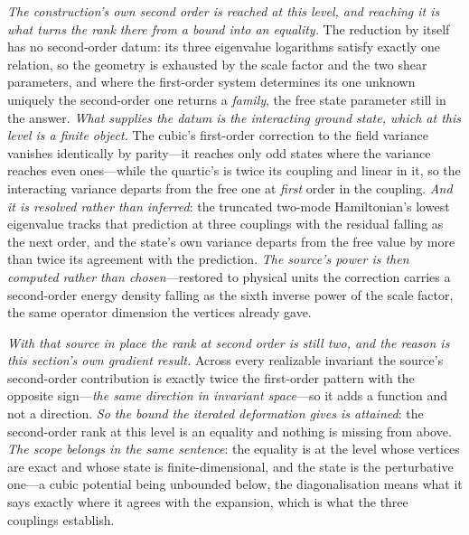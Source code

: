 \documentclass[11pt,a4paper]{article}
\theoremstyle{plain}
\theoremstyle{definition}
\theoremstyle{remark}
\begin{document}
\emph{The construction's own second order is reached at this level, and reaching it is what turns the rank
there from a bound into an equality.} The reduction by itself has no second-order datum: its three eigenvalue
logarithms satisfy exactly one relation, so the geometry is exhausted by the scale factor and the two shear
parameters, and where the first-order system determines its one unknown uniquely the second-order one returns a
\emph{family}, the free state parameter still in the answer. \emph{What supplies the datum is the interacting
ground state, which at this level is a finite object.} The cubic's first-order correction to the field variance
vanishes identically by parity---it reaches only odd states where the variance reaches even ones---while the
quartic's is twice its coupling and linear in it, so the interacting variance departs from the free one at
\emph{first} order in the coupling. \emph{And it is resolved rather than inferred}: the truncated two-mode
Hamiltonian's lowest eigenvalue tracks that prediction at three couplings with the residual falling as the next
order, and the state's own variance departs from the free value by more than twice its agreement with the
prediction. \emph{The source's power is then computed rather than chosen}---restored to physical units the
correction carries a second-order energy density falling as the sixth inverse power of the scale factor, the
same operator dimension the vertices already gave.

\emph{With that source in place the rank at second order is still two, and the reason is this section's own
gradient result.} Across every realizable invariant the source's second-order contribution is exactly twice the
first-order pattern with the opposite sign---\emph{the same direction in invariant space}---so it adds a
function and not a direction. \emph{So the bound the iterated deformation gives is attained}: the second-order
rank at this level is an equality and nothing is missing from
above.
\emph{The scope belongs in the same sentence}: the equality is at the level whose vertices are exact and whose
state is finite-dimensional, and the state is the perturbative one---a cubic potential being unbounded below,
the diagonalisation means what it says exactly where it agrees with the expansion, which is what the three
couplings establish.
\end{document}

